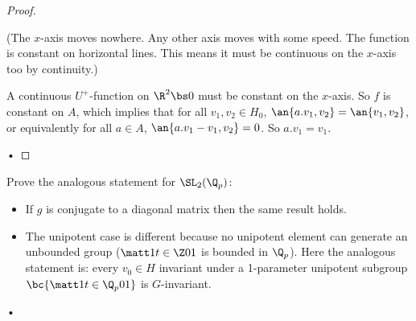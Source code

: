 \begin{proof}
\begin{enumerate}
(The $x$-axis moves nowhere. Any other axis moves with some speed. The function is constant on horizontal lines. This means it must be continuous on the $x$-axis too by continuity.) %

A continuous $U^+$-function on $\R^2\bs 0$ must be constant on the $x$-axis.
So $f$ is constant on $A$, %
which implies that for all $v_1,v_2\in H_0$, $\an{a.v_1,v_2}=\an{v_1,v_2}$, or equivalently for all $a\in A$, $\an{a.v_1-v_1,v_2}=0$. So $a.v_1=v_1$.
\end{enumerate}•
\end{proof}
\begin{exr}
Prove the analogous statement for $\SL_2(\Q_p)$: 
\begin{itemize}
\item
If $g$ is conjugate to a diagonal matrix then the same result holds. 
\item
The unipotent case is different because no unipotent element can generate an unbounded group ($\matt 1{t\in \Z}01$ is bounded in $\Q_p$). Here the analogous statement is: every $v_0\in H$ invariant under a 1-parameter unipotent subgroup $\bc{\matt 1{t\in \Q_p}01}$ is $G$-invariant. 
\end{itemize}•
\end{exr}






